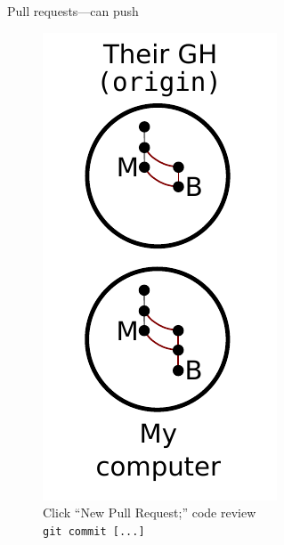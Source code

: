 \begin{frame}{Pull requests---can push}
  \begin{figure}
    \includegraphics{push_009.pdf}
    \\ Click ``New Pull Request;'' code review
    \\ \texttt{git commit [...]}
  \end{figure}
\end{frame}

